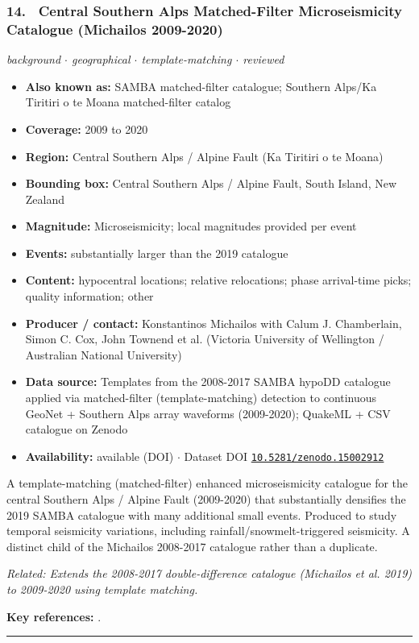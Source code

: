 \documentclass[10pt,a4paper]{article}
\newcommand{\catentryrule}{\par\vspace{3pt}\noindent\textcolor{rulegrey}{\rule{\linewidth}{0.3pt}}\par\vspace{5pt}}
\newcommand{\kv}[2]{\item \textbf{#1:} #2}
\begin{document}
\subsubsection*{\hypertarget{c:14}{14.}~ Central Southern Alps Matched-Filter Microseismicity Catalogue (Michailos 2009-2020)}
{\small\itshape background $\cdot$ geographical $\cdot$ template-matching $\cdot$ reviewed}\par\vspace{2pt}
\begin{itemize}[leftmargin=1.3em,itemsep=0.6pt,topsep=1pt,parsep=0pt]
\kv{Also known as}{SAMBA matched-filter catalogue; Southern Alps/Ka Tiritiri o te Moana matched-filter catalog}
\kv{Coverage}{2009 to 2020}
\kv{Region}{Central Southern Alps / Alpine Fault (Ka Tiritiri o te Moana)}
\kv{Bounding box}{Central Southern Alps / Alpine Fault, South Island, New Zealand}
\kv{Magnitude}{Microseismicity; local magnitudes provided per event}
\kv{Events}{substantially larger than the 2019 catalogue}
\kv{Content}{hypocentral locations; relative relocations; phase arrival-time picks; quality information; other}
\kv{Producer / contact}{Konstantinos Michailos with Calum J. Chamberlain, Simon C. Cox, John Townend et al. (Victoria University of Wellington / Australian National University)}
\kv{Data source}{Templates from the 2008-2017 SAMBA hypoDD catalogue applied via matched-filter (template-matching) detection to continuous GeoNet + Southern Alps array waveforms (2009-2020); QuakeML + CSV catalogue on Zenodo}
\kv{Availability}{available (DOI) $\cdot$ Dataset DOI \href{https://doi.org/10.5281/zenodo.15002912}{\nolinkurl{10.5281/zenodo.15002912}}}
\end{itemize}
\par\vspace{2pt}A template-matching (matched-filter) enhanced microseismicity catalogue for the central Southern Alps / Alpine Fault (2009-2020) that substantially densifies the 2019 SAMBA catalogue with many additional small events. Produced to study temporal seismicity variations, including rainfall/snowmelt-triggered seismicity. A distinct child of the Michailos 2008-2017 catalogue rather than a duplicate.
\par{\small\itshape Related: Extends the 2008-2017 double-difference catalogue (Michailos et al. 2019) to 2009-2020 using template matching.}
\par\vspace{2pt}\textbf{Key references:} \cite{Michailos2025,Michailos2025a}.
\catentryrule
\end{document}
